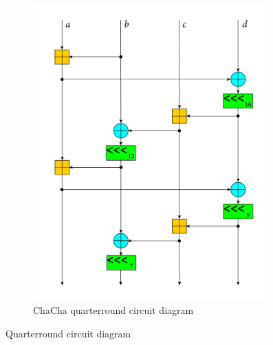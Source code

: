\begin{figure}
\begin{subfigure}[t]{0.5\textwidth}
  \includegraphics[width=0.99\textwidth]{figures/wiki-qr-circuit/chacha-wiki-qr-circuit.png}
  \caption{ChaCha quarterround circuit diagram}
  \label{fig:wiki.qr.circuit.chacha}
\end{subfigure}%
\caption{Quarterround circuit diagram}
\label{fig:wiki.qr.circuit}
\end{figure}

